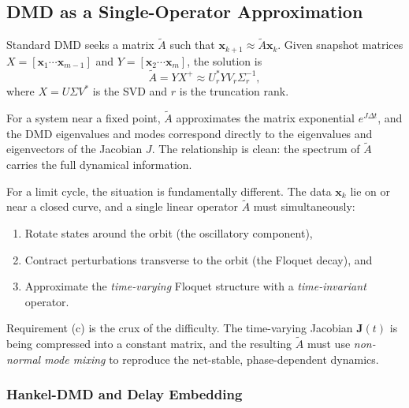 \documentclass[12pt]{article}
\newcommand{\Atilde}{\tilde{A}}
\begin{document}
\subsection{DMD as a Single-Operator Approximation}
\label{sec:dmd_background}

Standard DMD \citep{schmid2010dynamic} seeks a matrix $\Atilde$ such that
$\bm{x}_{k+1} \approx \Atilde \bm{x}_k$. Given snapshot matrices
$X = [\bm{x}_1 \cdots \bm{x}_{m-1}]$ and $Y = [\bm{x}_2 \cdots \bm{x}_m]$,
the solution is
\begin{equation}
  \Atilde = Y X^+ \approx U_r^* Y V_r \Sigma_r^{-1},
  \label{eq:dmd}
\end{equation}
where $X = U \Sigma V^*$ is the SVD and $r$ is the truncation rank.

For a system near a fixed point, $\Atilde$ approximates the matrix
exponential $e^{J \Delta t}$, and the DMD eigenvalues and modes correspond
directly to the eigenvalues and eigenvectors of the Jacobian $J$.
The relationship is clean: the spectrum of $\Atilde$ carries the full
dynamical information.

For a limit cycle, the situation is fundamentally different. The data
$\bm{x}_k$ lie on or near a closed curve, and a single linear operator
$\Atilde$ must simultaneously:
\begin{enumerate}[label=(\alph*)]
  \item Rotate states around the orbit (the oscillatory component),
  \item Contract perturbations transverse to the orbit (the Floquet
  decay), and
  \item Approximate the \emph{time-varying} Floquet structure with a
  \emph{time-invariant} operator.
\end{enumerate}
Requirement (c) is the crux of the difficulty. The time-varying Jacobian
$\bm{J}(t)$ is being compressed into a constant matrix, and the resulting
$\Atilde$ must use \emph{non-normal mode mixing} to reproduce the
net-stable, phase-dependent dynamics.

\subsubsection{Hankel-DMD and Delay Embedding}
\label{sec:hankel_dmd}
\end{document}
